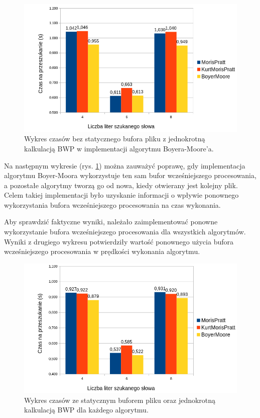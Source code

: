 \begin{figure}[htbp]
    \includegraphics[width=\textwidth]{./images/GraphPreAllocBM.png}
    \caption{Wykres czasów bez statycznego bufora pliku z jednokrotną kalkulacją
     BWP w implementacji algorytmu Boyera-Moore'a. }
    \label{fig:GraphPreAllocBM}
\end{figure}

Na następnym wykresie (rys. \ref{fig:GraphPreAllocBM}) można zauważyć poprawę, gdy
implementacja algorytmu Boyer-Moora wykorzystuje ten sam bufor wcześniejszego procesowania, a
pozostałe algorytmy tworzą go od nowa, kiedy otwierany jest kolejny plik. Celem 
takiej implementacji było uzyskanie informacji o wpływie ponownego wykorzystania
bufora wcześniejszego procesowania na czas wykonania. 

Aby sprawdzić faktyczne wyniki, należało zaimplementować ponowne wykorzystanie
bufora wcześniejszego procesowania dla wszystkich algorytmów. Wyniki z drugiego wykresu 
potwierdziły wartość ponownego użycia bufora wcześniejszego procesowania w prędkości wykonania
algorytmu.

\begin{figure}[htbp]
    \includegraphics[width=\textwidth]{./images/GraphStaticPreallocAndFileBuffer.png}
    \caption{Wykres czasów ze statycznym buforem pliku oraz jednokrotną kalkulacją BWP dla każdego algorytmu.}
    \label{fig:GraphStaticPreallocAndFileBuffer}
\end{figure}

